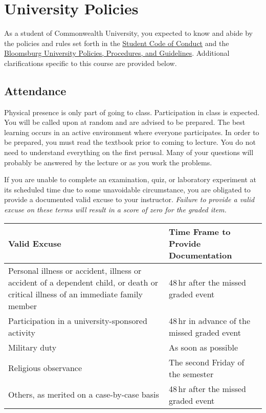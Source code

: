 \documentclass[11pt,letterpaper]{article}
\begin{document}
\section{University Policies}
As a student of Commonwealth University, you expected to know and abide by the
policies and rules set forth in the
\href{https://www.commonwealthu.edu/student-handbook/code-of-conduct}{Student
Code of Conduct} and the
\href{https://www.bloomu.edu/about/administration-and-governance/policies}{Bloomsburg
	University Policies, Procedures, and Guidelines}. Additional
	clarifications specific to this course are provided below.

\subsection{Attendance}
Physical presence is only part of going to class. Participation in class is
expected. You will be called upon at random and are advised to be prepared.
The best learning occurs in an active environment where everyone participates.
In order to be prepared, you must read the textbook prior to coming to
lecture.  You do not need to understand everything on the first perusal. Many
of your questions will probably be answered by the lecture or as you work the
problems.

If you are unable to complete an examination, quiz, or laboratory experiment at its scheduled time due to some
unavoidable circumstance, you are obligated to provide a documented valid excuse
to your instructor. \emph{Failure to provide a valid excuse on these terms will
	result in a score of zero for the graded item.}

	\begin{center}
		\renewcommand\arraystretch{1.25}
\begin{tabularx}{\linewidth} {X X}
	\toprule
	\bfseries Valid Excuse & \bfseries Time Frame to Provide Documentation
	\\ \midrule
	Personal illness or accident, illness or accident of a dependent child,
	or death or critical illness of an immediate family member &
	48\,hr after the missed graded event \\
	Participation in a university-sponsored activity &
	48\,hr in advance of the missed graded event \\
	Military duty & As soon as possible \\
	Religious observance & The second Friday of the semester \\
	Others, as merited on a case-by-case basis & 48\,hr after the
	missed graded event \\
	\bottomrule
\end{tabularx}
\end{center}
\end{document}
